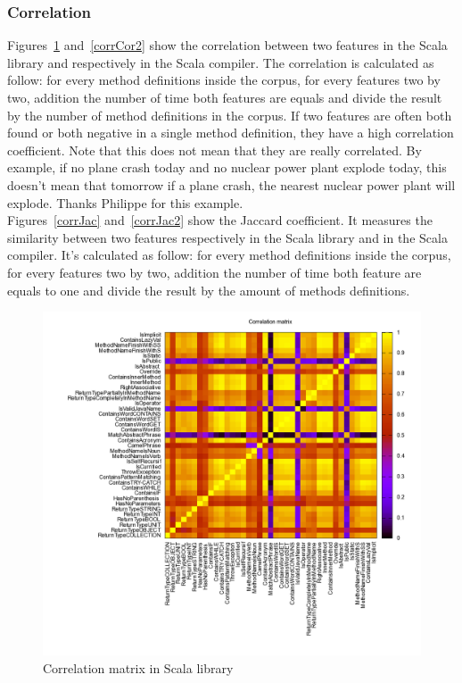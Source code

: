 \documentclass[12pt]{article}
\begin{document}
\subsubsection {Correlation}
Figures~\ref{corrCor} and~\ref{corrCor2} show the correlation between two features in the Scala library and respectively in the Scala compiler. The correlation is calculated as follow: for every method definitions inside the corpus, for every features two by two, addition the number of time both features are equals and divide the result by the number of method definitions in the corpus. If two features are often both found or both negative in a single method definition, they have a high correlation coefficient. Note that this does not mean that they are really correlated. By example, if no plane crash today and no nuclear power plant explode today, this doesn't mean that tomorrow if a plane crash, the nearest nuclear power plant will explode. Thanks Philippe for this example.\\
Figures~\ref{corrJac} and~\ref{corrJac2} show the Jaccard coefficient. It measures the similarity between two features respectively in the Scala library and in the Scala compiler. It's calculated as follow: for every method definitions inside the corpus, for every features two by two, addition the number of time both feature are equals to one and divide the result by the amount of methods definitions.
\begin{figure}[h]
\centering
\includegraphics[width=17cm]{images/corrCOR.png}
\caption{Correlation matrix in Scala library}
\label{corrCor}
\end{figure}
\end{document}
